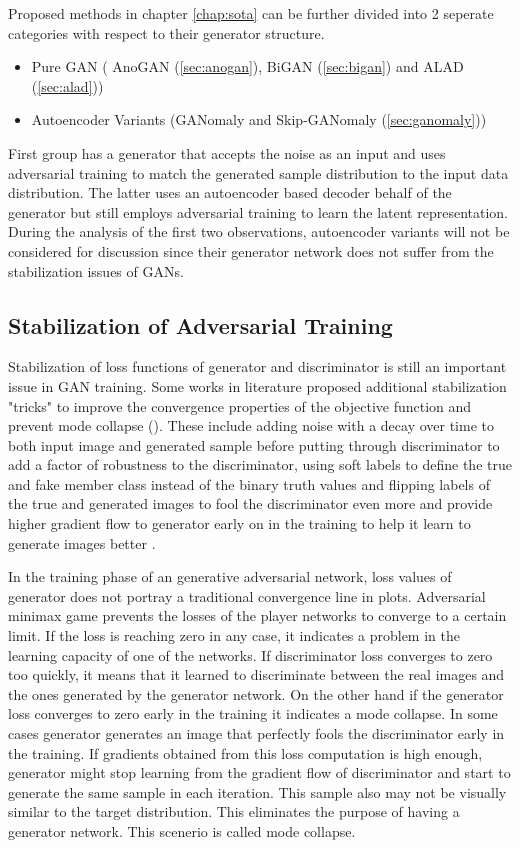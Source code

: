 Proposed methods in chapter \ref{chap:sota} can be further divided into 2 seperate categories with respect to their generator structure. 
\begin{itemize}
	\item Pure GAN ( AnoGAN (\ref{sec:anogan}), BiGAN (\ref{sec:bigan}) and ALAD (\ref{sec:alad}))
	\item Autoencoder Variants (GANomaly and Skip-GANomaly (\ref{sec:ganomaly}))
\end{itemize}

First group has a generator that accepts the noise as an input and uses adversarial training to match the generated sample distribution 
to the input data distribution. The latter uses an autoencoder based decoder behalf of the generator but still employs adversarial training
to learn the latent representation. During the analysis of the first two observations, autoencoder variants will not be considered for discussion 
since their generator network does not suffer from the stabilization issues of GANs.

\subsection{Stabilization of Adversarial Training}

Stabilization of loss functions of generator and discriminator is still an important issue in GAN training. 
Some works in literature proposed additional stabilization "tricks" to improve the convergence properties of the objective function 
and prevent mode collapse (\cite{methods,fm}). These include adding noise with a decay over time to both input image and generated 
sample before putting through discriminator to add a factor of robustness to the discriminator, using soft labels to define the true 
and fake member class instead of the binary truth values and flipping labels of the true and generated images to fool the discriminator even more
and provide higher gradient flow to generator early on in the training to help it learn to generate images better \cite{fm}.

In the training phase of an generative adversarial network, loss values of generator does not portray a traditional convergence line in plots.
Adversarial minimax game prevents the losses of the player networks to converge to a certain limit. If the loss is reaching zero in any case, it indicates 
a problem in the learning capacity of one of the networks. If discriminator loss converges to zero too quickly, it means that it learned to 
discriminate between the real images and the ones generated by the generator network. On the other hand if the generator loss converges to zero 
early in the training it indicates a mode collapse. In some cases generator generates an image that perfectly fools the discriminator early in the 
training. If gradients obtained from this loss computation is high enough, generator might stop learning from the gradient flow of discriminator 
and start to generate the same sample in each iteration. This sample also may not be visually similar to the target distribution. This eliminates the 
purpose of having a generator network. This scenerio is called mode collapse. 

